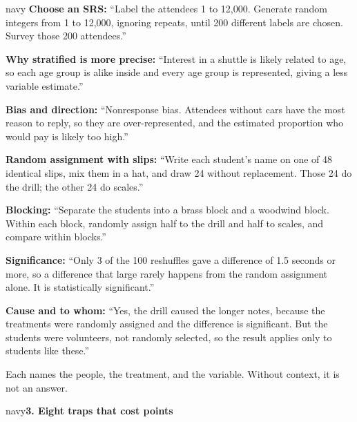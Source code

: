 \documentclass[12pt]{article}
\newcommand{\sghead}[2][10]{%
  \vspace{0.13in}
  \boxguard[#1]
  \begin{headlinebox}{navy}\color{white}\bfseries\small #2\end{headlinebox}
  \vspace{0.09in}}
\begin{document}
\vspace{0.10in}
\boxguard[20]
\begin{scenariobox}{navy}
\small
\textbf{Choose an SRS:} ``Label the attendees 1 to 12{,}000. Generate random integers from 1 to
12{,}000, ignoring repeats, until 200 different labels are chosen. Survey those 200
attendees.''\par\vspace{3pt}
\textbf{Why stratified is more precise:} ``Interest in a shuttle is likely related to age, so each
age group is alike inside and every age group is represented, giving a less variable
estimate.''\par\vspace{3pt}
\textbf{Bias and direction:} ``Nonresponse bias. Attendees without cars have the most reason to
reply, so they are over-represented, and the estimated proportion who would pay is likely too
high.''\par\vspace{3pt}
\textbf{Random assignment with slips:} ``Write each student's name on one of 48 identical slips,
mix them in a hat, and draw 24 without replacement. Those 24 do the drill; the other 24 do
scales.''\par\vspace{3pt}
\textbf{Blocking:} ``Separate the students into a brass block and a woodwind block. Within each
block, randomly assign half to the drill and half to scales, and compare within blocks.''
\par\vspace{3pt}
\textbf{Significance:} ``Only 3 of the 100 reshuffles gave a difference of 1.5 seconds or more, so
a difference that large rarely happens from the random assignment alone. It is statistically
significant.''\par\vspace{3pt}
\textbf{Cause and to whom:} ``Yes, the drill caused the longer notes, because the treatments were
randomly assigned and the difference is significant. But the students were volunteers, not
randomly selected, so the result applies only to students like these.''\par\vspace{3pt}
Each names the people, the treatment, and the variable. Without context, it is not an answer.
\end{scenariobox}

\sghead{3. Eight traps that cost points}
\end{document}
